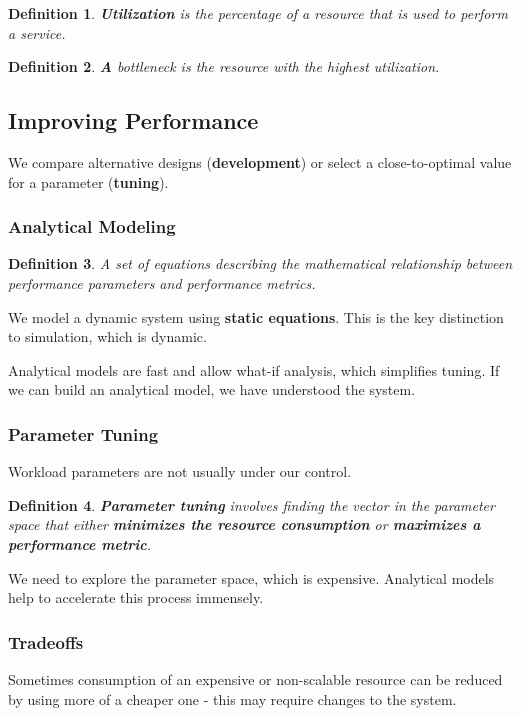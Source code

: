 \documentclass[11pt]{article}
\newtheorem{defn}{Definition}
\begin{document}
\begin{defn}
  \textbf{Utilization} is the percentage of a resource that is used to perform a service.
\end{defn}

\begin{defn}
  \textbf A {bottleneck} is the resource with the highest utilization.
\end{defn}

\subsection{Improving Performance}
We compare alternative designs (\textbf{development}) or select a close-to-optimal value for a parameter (\textbf{tuning}).

\subsubsection{Analytical Modeling}
\begin{defn}
  A set of equations describing the mathematical relationship between performance parameters and performance metrics.
\end{defn}

We model a dynamic system using \textbf{static equations}.
This is the key distinction to simulation, which is dynamic.

Analytical models are fast and allow what-if analysis, which simplifies tuning.
If we can build an analytical model, we have understood the system.

\subsubsection{Parameter Tuning}
Workload parameters are not usually under our control.
\begin{defn}
  \textbf{Parameter tuning} involves finding the vector in the parameter space that either \textbf{minimizes the resource consumption} or \textbf{maximizes a performance metric}. 
\end{defn}
We need to explore the parameter space, which is expensive.
Analytical models help to accelerate this process immensely.

\subsubsection{Tradeoffs}
Sometimes consumption of an expensive or non-scalable resource can be reduced by using more of a cheaper one - this may require changes to the system.
\end{document}
